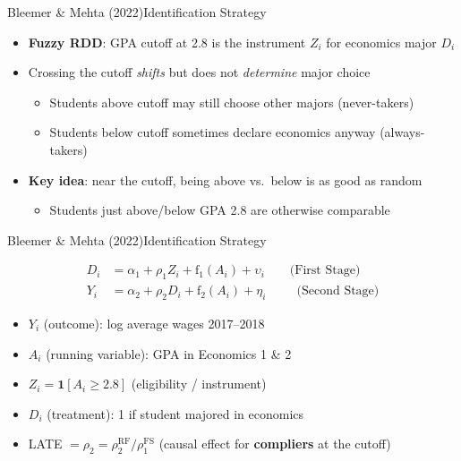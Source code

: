 \documentclass[hyperref={pdfpagelabels=false}]{beamer}
\begin{document}
\begin{frame}{Bleemer \& Mehta (2022)}{Identification Strategy}
	\begin{itemize}
		\item \textbf{Fuzzy RDD}: GPA cutoff at 2.8 is the instrument $Z_i$ for economics major $D_i$
		\vspace{0.2cm}
		\item Crossing the cutoff \emph{shifts} but does not \emph{determine} major choice
		\begin{itemize}
			\vspace{0.2cm}
			\item Students above cutoff may still choose other majors (never-takers)
			\item Students below cutoff sometimes declare economics anyway (always-takers)
		\end{itemize}
		\vspace{0.2cm}
		\item \textbf{Key idea}: near the cutoff, being above vs.\ below is as good as random
		\begin{itemize}
			\vspace{0.2cm}
			\item Students just above/below GPA 2.8 are otherwise comparable
		\end{itemize}
	\end{itemize}
\end{frame}


\begin{frame}{Bleemer \& Mehta (2022)}{Identification Strategy}

	\begin{equation*}
	\begin{aligned}
	D_i &= \alpha_1 + \rho_1 Z_i + \mathrm{f}_1(A_i) + \upsilon_i \qquad \text{(First Stage)}\\
	Y_i &= \alpha_2 + \rho_2 D_i + \mathrm{f}_2(A_i) + \eta_i \qquad\;\, \text{(Second Stage)}
	\end{aligned}
	\end{equation*}

	\begin{itemize}
		\item $Y_i$ (outcome): log average wages 2017--2018
		\vspace{0.2cm}
		\item $A_i$ (running variable): GPA in Economics 1 \& 2
		\vspace{0.2cm}
		\item $Z_i = \mathbf{1}[A_i \geq 2.8]$ (eligibility / instrument)
		\vspace{0.2cm}
		\item $D_i$ (treatment): 1 if student majored in economics
		\vspace{0.2cm}
		\item LATE $= \rho_2 = \rho_2^{\text{RF}} / \rho_1^{\text{FS}}$
		(causal effect for \textbf{compliers} at the cutoff)
	\end{itemize}
\end{frame}
\end{document}
